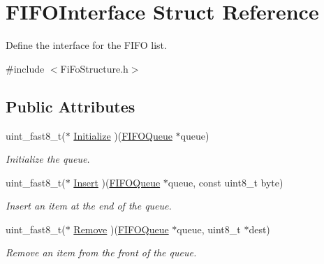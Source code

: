 \hypertarget{struct_f_i_f_o_interface}{\section{F\+I\+F\+O\+Interface Struct Reference}
\label{struct_f_i_f_o_interface}
}


Define the interface for the F\+I\+F\+O list.  




{\ttfamily \#include $<$Fi\+Fo\+Structure.\+h$>$}

\subsection*{Public Attributes}
\begin{DoxyCompactItemize}
\item 
\hypertarget{struct_f_i_f_o_interface_a0b81d1ec27ad958052bb738d648b918d}{uint\+\_\+fast8\+\_\+t($\ast$ \hyperlink{struct_f_i_f_o_interface_a0b81d1ec27ad958052bb738d648b918d}{Initialize} )(\hyperlink{struct_f_i_f_o_queue}{F\+I\+F\+O\+Queue} $\ast$queue)}\label{struct_f_i_f_o_interface_a0b81d1ec27ad958052bb738d648b918d}

\begin{DoxyCompactList}\small\item\em Initialize the queue. \end{DoxyCompactList}\item 
\hypertarget{struct_f_i_f_o_interface_a13650d378f9fb6ac8cf85b53e8cb5c90}{uint\+\_\+fast8\+\_\+t($\ast$ \hyperlink{struct_f_i_f_o_interface_a13650d378f9fb6ac8cf85b53e8cb5c90}{Insert} )(\hyperlink{struct_f_i_f_o_queue}{F\+I\+F\+O\+Queue} $\ast$queue, const uint8\+\_\+t byte)}\label{struct_f_i_f_o_interface_a13650d378f9fb6ac8cf85b53e8cb5c90}

\begin{DoxyCompactList}\small\item\em Insert an item at the end of the queue. \end{DoxyCompactList}\item 
\hypertarget{struct_f_i_f_o_interface_a788123f94d12c514e9164eda8b2b1960}{uint\+\_\+fast8\+\_\+t($\ast$ \hyperlink{struct_f_i_f_o_interface_a788123f94d12c514e9164eda8b2b1960}{Remove} )(\hyperlink{struct_f_i_f_o_queue}{F\+I\+F\+O\+Queue} $\ast$queue, uint8\+\_\+t $\ast$dest)}\label{struct_f_i_f_o_interface_a788123f94d12c514e9164eda8b2b1960}

\begin{DoxyCompactList}\small\item\em Remove an item from the front of the queue. \end{DoxyCompactList}\end{DoxyCompactItemize}


